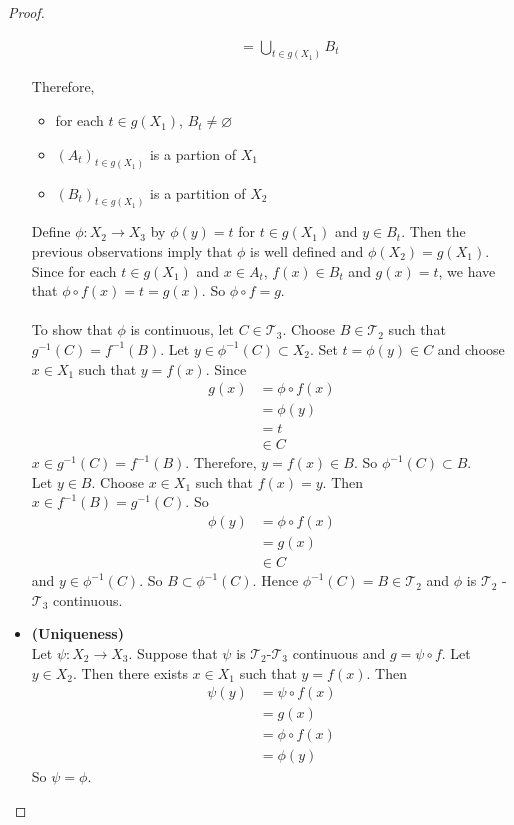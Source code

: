 \documentclass[12pt]{amsart}
\theoremstyle{definition}
\newcommand{\MT}{\mathcal{T}}
\begin{document}
\begin{proof}
\begin{itemize}
\begin{itemize}
\begin{align*}
	&= \bigcup_{t \in g(X_1)} B_t
	\end{align*}
	\end{itemize}
	Therefore, 
	\begin{itemize}
	\item for each $t \in g(X_1)$, $B_t \neq \varnothing$
	\item $(A_t)_{t \in g(X_1)}$ is a partion of $X_1$
	\item $(B_t)_{t \in g(X_1)}$ is a partition of $X_2$\\
\end{itemize}		
	 Define $\phi:X_2 \rightarrow X_3$ by $\phi(y) = t$ for $t \in g(X_1)$ and $y \in B_t $. Then the previous observations imply that $\phi$ is well defined and $\phi(X_2) = g(X_1)$. Since for each $t \in g(X_1)$ and $x \in A_t$, $f(x) \in B_t$ and $g(x) = t$, we have that $\phi \circ f (x) = t = g(x)$. So $\phi \circ f = g$. \\ \\
	To show that $\phi$ is continuous, let $C \in \MT_3$. Choose $B \in \MT_2$ such that $g^{-1}(C) = f^{-1}(B)$.
	Let $y \in \phi^{-1}(C) \subset X_2$. Set $t = \phi(y) \in C$ and choose $x \in X_1$ such that $y = f(x)$. Since 
	\begin{align*}
	g(x) 
	&= \phi \circ f (x) \\
	&= \phi(y) \\
	&= t \\
	&\in C
\end{align*}		
	 $x \in g^{-1}(C) = f^{-1}(B)$. Therefore, $y = f(x) \in B$. So $\phi^{-1}(C) \subset B$. \\
	Let $y \in B$. Choose $x \in X_1$ such that $f(x) = y$. Then $x \in f^{-1}(B) = g^{-1}(C)$. So 
	\begin{align*}
	\phi(y) 
	&= \phi \circ f (x) \\
	&= g(x) \\
	&\in C
	\end{align*}	 
	and $y \in \phi^{-1}(C)$. So $B \subset \phi^{-1}(C)$. 
	Hence $\phi^{-1}(C) = B \in \MT_2$ and $\phi$ is $\MT_2$ - $\MT_3$ continuous.\\
	\item \textbf{(Uniqueness)} \\
	Let $\psi: X_2 \rightarrow X_3$. Suppose that $\psi$ is $\MT_2$-$\MT_3$ continuous and $g = \psi \circ f$. Let $y \in X_2$. Then there exists $x \in X_1$ such that $y = f(x)$. Then 
	\begin{align*}
	\psi(y) 
	&= \psi \circ f(x) \\
	&= g(x) \\
	&= \phi \circ f(x) \\
	&= \phi(y)
	\end{align*}
	So $\psi = \phi$.
	\end{itemize}
 
	\end{proof}
\end{document}
